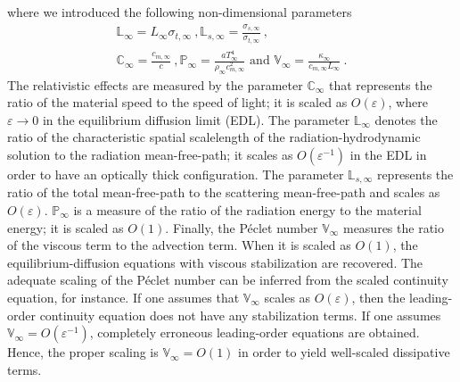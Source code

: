 \documentclass[review]{elsarticle}
\renewcommand{\Re}{\textrm{Re}}
\newcommand{\Us}{\textrm{U}}
\newcommand{\Ls}{\textrm{L}}
\newcommand{\Pe}{\textrm{P\'e}}
\renewcommand{\Re}{\mathbb{P}_\infty}
\renewcommand{\Us}{\mathbb{C}_\infty}
\renewcommand{\Pe}{\mathbb{V}_\infty}
\renewcommand{\Ls}{\mathbb{L}_\infty}
\newcommand{\Lsi}{\mathbb{L}_{s,\infty}}
\begin{document}
%
where we introduced the following non-dimensional parameters
%
\begin{multline}\label{eq:scaled-nb}
\Ls = L_\infty \sigma_{t,\infty} \ , 
\Lsi = \frac{\sigma_{s,\infty}}{\sigma_{t,\infty}} \ , \\
\Us = \frac{c_{m,\infty}}{c} \ ,   
\Re = \frac{a T^4_\infty}{\rho_\infty c^2_{m,\infty} } 
\text{ and } \Pe = \frac{\kappa_\infty}{c_{m,\infty} L_\infty} \ .
\end{multline}
%
The relativistic effects are measured by the parameter $\Us$ that represents the ratio of the material speed to the speed of light; it is scaled as  $O(\varepsilon)$, where $\varepsilon \to 0$ in the equilibrium diffusion limit (EDL).
%
The parameter $\Ls$ denotes the ratio of the characteristic spatial scalelength of the radiation-hydrodynamic solution to the radiation mean-free-path; it scales as $O(\varepsilon^{-1})$ in the EDL in order to have an optically thick configuration. 
%
The parameter $\Lsi$ represents the ratio of the total mean-free-path to the scattering mean-free-path and scales as $O(\varepsilon)$. 
%
$\Re$ is a measure of the ratio of the radiation energy to the material energy; it is scaled as $O(1)$. 
%
Finally, the P\'eclet number $\Pe$ measures the ratio of the viscous term to the advection term. When it is scaled as $O(1)$, the equilibrium-diffusion equations with viscous stabilization are recovered. 
%
The adequate scaling of the P\'eclet number can be inferred from the scaled continuity equation, for instance. If one assumes that $\Pe$ scales as $O(\varepsilon)$, then the leading-order continuity equation does not have any stabilization terms. If one assumes $\Pe = O(\varepsilon^{-1})$, completely erroneous leading-order equations are obtained. Hence, the proper scaling is $\Pe = O(1)$ in order to yield well-scaled dissipative terms. 
\end{document}
